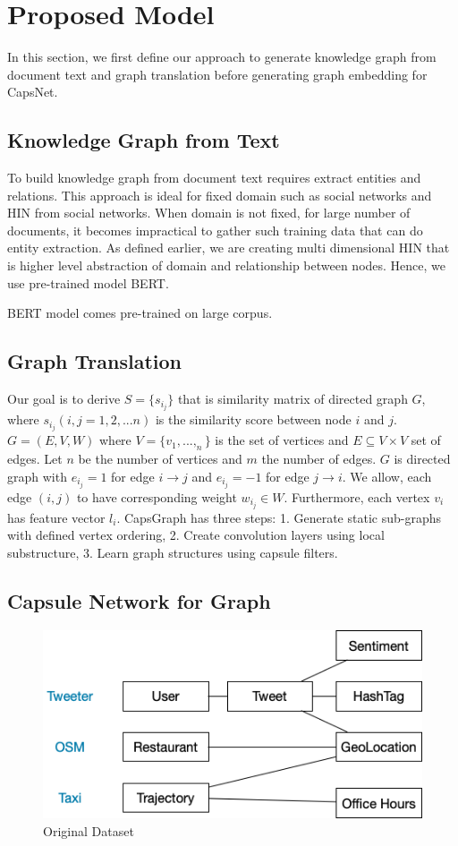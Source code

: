 \section{Proposed Model}
In this section, we first define our approach to generate knowledge graph from document text and graph translation before generating graph embedding for CapsNet.
\subsection{Knowledge Graph from Text}
To build knowledge graph from document text requires extract entities and relations. This approach is ideal for fixed domain such as social networks and HIN from social networks. When domain is not fixed, for large number of documents, it becomes impractical to gather such training data that can do entity extraction. As defined earlier, we are creating multi dimensional HIN that is higher level abstraction of domain and relationship between nodes. Hence, we use pre-trained model BERT\cite{devlin2018bert}.

BERT model comes pre-trained on large corpus.  

\subsection{Graph Translation}
Our goal is to derive $ S= \{ s_i_j \}$ that is similarity matrix of directed graph $ G $, where  $ s_i_j (i, j=1, 2, ... n) $ is the similarity score between node $i$ and $j$. $G=(E,V,W)$ where $V=\{ v_1,...,_n \} $ is the set of vertices and  $E  \subseteq V \times V$ set of edges. Let $ n $ be the number of vertices and $ m $ the number of edges. $G$ is directed graph with $e_i_j=1$ for edge $i \to j$ and $e_i_j=-1$ for edge $j \to i$. We allow, each edge $(i,j)$ to have corresponding weight $w_i_j \in W$. Furthermore, each vertex $v_i$ has feature vector $l_i$.
CapsGraph has three steps: 1. Generate static sub-graphs with defined vertex ordering, 2. Create convolution layers using local substructure, 3. Learn graph structures using capsule filters.

\subsection{Capsule Network for Graph}

\begin{figure}[!htbp]
  \centering
  \includegraphics[width=\linewidth,height=\textheight,keepaspectratio]{images/Sample_Data}
  \caption{Original Dataset}
  \label{sample_data}
\end{figure}

